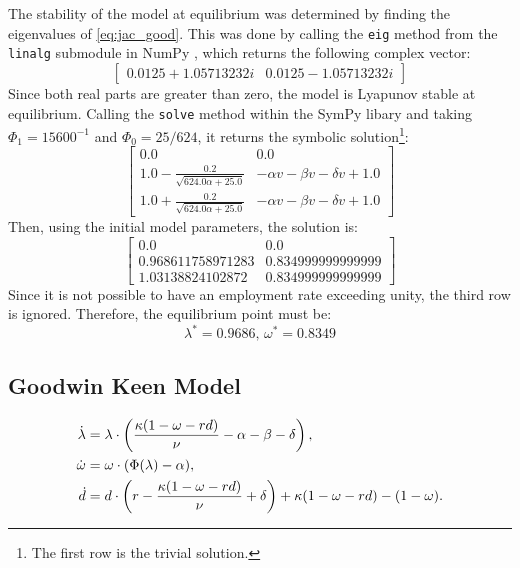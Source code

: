 \documentclass[12pt, centerh1]{article}
\begin{document}
\noindent
The stability of the model at equilibrium was determined by finding the eigenvalues of \eqref{eq:jac_good}. This was done by calling the \texttt{eig} method from the \texttt{linalg} submodule in NumPy \citep{2020NumPy-Array}, which returns the following complex vector:
\[
\begin{bmatrix}
    0.0125+1.05713232i & 0.0125-1.05713232i
\end{bmatrix}
\]
Since both real parts are greater than zero, the model is Lyapunov stable at equilibrium.
Calling the \texttt{solve} method within the SymPy libary \citep{SymPy} and taking $\Phi_1=15600^{-1}$ and $\Phi_0=25/624$, it returns the symbolic solution\footnote{The first row is the trivial solution.}:
\[
\begin{bmatrix}
    0.0 & 0.0\\[1ex]
    1.0-\frac{0.2}{\sqrt{624.0\alpha+25.0}} & -\alpha v - \beta v -\delta v +1.0\\[1ex]
    1.0+\frac{0.2}{\sqrt{624.0\alpha+25.0}}& -\alpha v - \beta v -\delta v + 1.0 
\end{bmatrix}
\]
\noindent
Then, using the initial model parameters, the solution is:
\[
\begin{bmatrix}
    0.0 & 0.0\\[1ex]
    \num{0.968611758971283} & \num{0.834999999999999}\\[1ex]
    \num{1.03138824102872} & \num{0.834999999999999} 
\end{bmatrix}
\]
Since it is not possible to have an employment rate exceeding unity, the third row is ignored. Therefore, the equilibrium point must be:
\begin{equation*}
    \lambda^\ast = \num{0.9686}\text{, } \omega^\ast = \num{0.8349}
\end{equation*}
\subsection{Goodwin Keen Model}

\begin{align*} 
\centering
    \dot{\lambda} &= \lambda \cdot \left( \frac{\kappa(1-\omega-rd)}{\nu} - \alpha - \beta - \delta \right),\\
    \dot{\omega} &= \omega \cdot (\Phi(\lambda) - \alpha),\\
    \dot{d} &= d\cdot\left(r-\frac{\kappa(1-\omega-rd)}{\nu}+\delta\right)+\kappa(1-\omega-rd)-(1-\omega). 
\end{align*}
\end{document}
